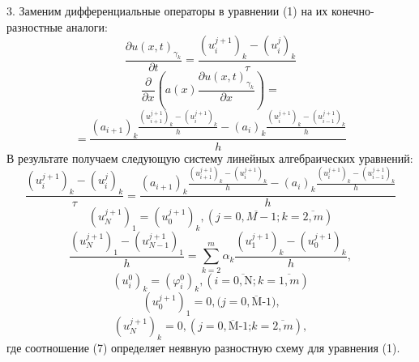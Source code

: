 	3. Заменим дифференциальные операторы в уравнении (1) на их конечно-разностные аналоги:
$$\frac{\partial u{{(x,t)}_{{{\gamma }_{k}}}}}{\partial t}=\frac{{{\left( u_{i}^{j+1} \right)}_{k}}-{{\left( u_{i}^{j} \right)}_{k}}}{\tau }$$
$$\frac{\partial }{\partial x}\left( a(x)\frac{\partial u{{(x,t)}_{{{\gamma }_{k}}}}}{\partial x} \right)=$$
$$=\frac{{{({{a}_{i+1}})}_{k}}\frac{{{(u_{i+1}^{j+1})}_{k}}-{{(u_{i}^{j+1})}_{k}}}{h}-{{({{a}_{i}})}_{k}}\frac{{{(u_{i}^{j+1})}_{k}}-{{(u_{i-1}^{j+1})}_{k}}}{h}}{h}$$
В результате получаем следующую систему линейных алгебраических уравнений:
\begin{equation}\label{tran_eq7}
\frac{{{\left( u_{i}^{j+1} \right)}_{k}}-{{\left( u_{i}^{j} \right)}_{k}}}{\tau }=\frac{{{({{a}_{i+1}})}_{k}}\frac{{{(u_{i+1}^{j+1})}_{k}}-{{(u_{i}^{j+1})}_{k}}}{h}-{{({{a}_{i}})}_{k}}\frac{{{(u_{i}^{j+1})}_{k}}-{{(u_{i-1}^{j+1})}_{k}}}{h}}{h}
\end{equation}
\begin{equation}\label{tran_eq8}
{{\left( u_{N}^{j+1} \right)}_{1}}={{\left( u_{0}^{j+1} \right)}_{k}},(j=\overline{0,M-1};k=\overline{2,m})
\end{equation}
\begin{equation}\label{tran_eq9}
\frac{{{\left( u_{N}^{j+1} \right)}_{1}}-{{\left( u_{N-1}^{j+1} \right)}_{1}}}{h}=\sum\limits_{k=2}^{m}{{{\alpha }_{k}}\frac{{{\left( u_{1}^{j+1} \right)}_{k}}-{{\left( u_{0}^{j+1} \right)}_{k}}}{h}},
\end{equation}
\begin{equation}\label{tran_eq10}
{{\left( u_{i}^{0} \right)}_{k}}={{\left( \varphi _{i}^{0} \right)}_{k}}, (i=\overline{0,\text{N}};k=\overline{1,m})
\end{equation}
\begin{equation}\label{tran_eq11}
{{\left( u_{0}^{j+1} \right)}_{1}}=0,(j=\overline{0,\text{M-1}}\text{)}\text{,}
\end{equation}
\begin{equation}\label{tran_eq12}
{{\left( u_{N}^{j+1} \right)}_{k}}=0, (j=\overline{0,\text{M-1}}\text{;} k=\overline{2,m}),
\end{equation}
где соотношение (7) определяет неявную разностную схему для уравнения (1).

